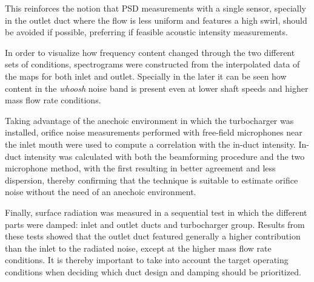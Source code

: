 This reinforces the notion that PSD measurements with a single sensor, specially in the outlet duct where the flow is less uniform and features a high swirl, should be avoided if possible, preferring if feasible acoustic intensity measurements.

In order to visualize how frequency content changed through the two different sets of conditions, spectrograms were constructed from the interpolated data of the maps for both inlet and outlet. Specially in the later it can be seen how content in the \emph{whoosh} noise band is present even at lower shaft speeds and higher mass flow rate conditions. 

Taking advantage of the anechoic environment in which the turbocharger was installed, orifice noise measurements performed with free-field microphones near the inlet mouth were used to compute a correlation with the in-duct intensity. In-duct intensity was calculated with both the beamforming procedure and the two microphone method, with the first resulting in better agreement and less dispersion, thereby confirming that the technique is suitable to estimate orifice noise without the need of an anechoic environment.

Finally, surface radiation was measured in a sequential test in which the different parts were damped: inlet and outlet ducts and turbocharger group. Results from these tests showed that the outlet duct featured generally a higher contribution than the inlet to the radiated noise, except at the higher mass flow rate conditions. It is thereby important to take into account the target operating conditions when deciding which duct design and damping should be prioritized.